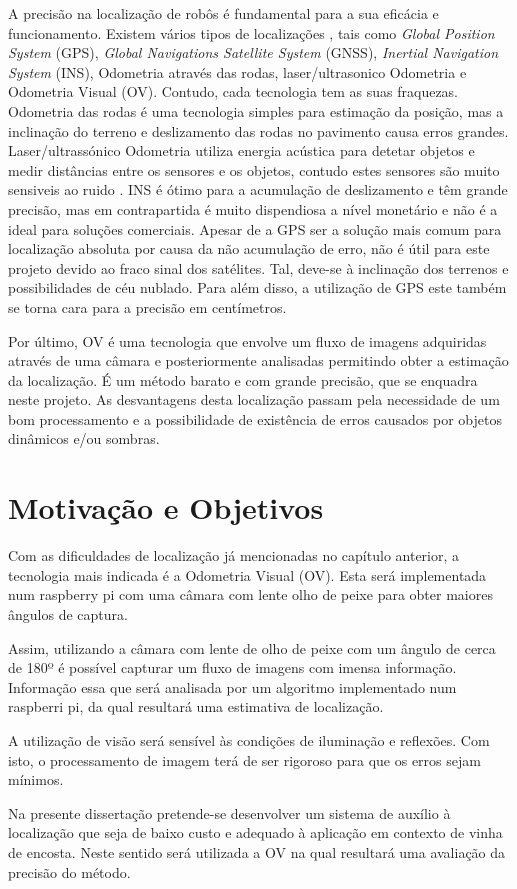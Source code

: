 A precisão na localização de robôs é fundamental para a sua eficácia e funcionamento. Existem vários tipos de localizações , tais como \textit{Global Position System} (GPS), \textit{Global Navigations Satellite System} (GNSS), \textit{Inertial Navigation System} (INS), Odometria através das rodas, laser/ultrasonico Odometria e Odometria Visual (OV). Contudo, cada tecnologia tem as suas fraquezas. Odometria das rodas é uma tecnologia simples para estimação da posição, mas a inclinação do terreno e deslizamento das rodas no pavimento causa erros grandes. Laser/ultrassónico  Odometria utiliza energia acústica para detetar objetos e medir distâncias entre os sensores e os objetos, contudo estes sensores são muito sensiveis ao ruido . INS é ótimo para a acumulação de deslizamento e têm grande precisão, mas em contrapartida é muito dispendiosa a nível monetário e não é a ideal para soluções comerciais. Apesar de a GPS  ser a solução mais comum para localização absoluta por causa da não acumulação de erro, não é útil para este projeto devido ao fraco sinal dos satélites. Tal, deve-se à inclinação dos terrenos e possibilidades de céu nublado. Para além disso, a utilização de GPS este também se torna cara para a precisão em centímetros. \cite{Aqel2016}

Por último, OV é uma tecnologia que envolve um fluxo de imagens adquiridas através de uma câmara e posteriormente analisadas permitindo obter a estimação da localização. É um método barato e com grande precisão, que se enquadra neste projeto. As desvantagens desta localização passam pela necessidade de um bom processamento e a possibilidade de existência de erros causados por objetos dinâmicos e/ou sombras.

\section{Motivação e Objetivos} \label{sec:context}

Com as dificuldades de localização já mencionadas no capítulo anterior, a tecnologia mais indicada é a Odometria Visual (OV). Esta será implementada num raspberry pi com uma câmara com lente olho de peixe para obter maiores ângulos de captura.

Assim, utilizando a câmara com lente de olho de peixe com um ângulo de cerca de 180º é possível capturar um fluxo de imagens com imensa informação. Informação essa que será analisada por um algoritmo implementado num raspberri pi, da qual resultará uma estimativa de localização.

A utilização de visão será sensível às condições de iluminação e reflexões. Com isto, o processamento de imagem terá de ser rigoroso para que os erros sejam mínimos.

Na presente dissertação pretende-se desenvolver um sistema de auxílio à localização que seja de baixo custo e adequado à aplicação em contexto de vinha de encosta. Neste sentido será utilizada a OV na qual resultará uma avaliação da precisão do método.
